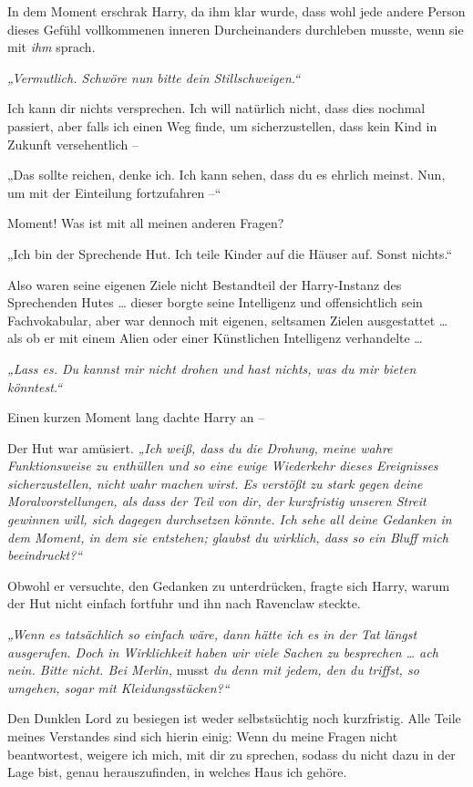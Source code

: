 {In dem Moment erschrak Harry, da ihm klar wurde, dass wohl jede andere Person dieses Gefühl vollkommenen inneren Durcheinanders durchleben musste, wenn sie mit \emph{ihm} sprach.

\emph{„Vermutlich. Schwöre nun bitte dein Stillschweigen.“}

Ich kann dir nichts versprechen. Ich will natürlich nicht, dass dies nochmal passiert, aber falls ich einen Weg finde, um sicherzustellen, dass kein Kind in Zukunft versehentlich --

„Das sollte reichen, denke ich. Ich kann sehen, dass du es ehrlich meinst. Nun, um mit der Einteilung fortzufahren --“

Moment! Was ist mit all meinen anderen Fragen?

„Ich bin der Sprechende Hut. Ich teile Kinder auf die Häuser auf. Sonst nichts.“

Also waren seine eigenen Ziele nicht Bestandteil der Harry-Instanz des Sprechenden Hutes … dieser borgte seine Intelligenz und offensichtlich sein Fachvokabular, aber war dennoch mit eigenen, seltsamen Zielen ausgestattet … als ob er mit einem Alien oder einer Künstlichen Intelligenz verhandelte …

\emph{„Lass es. Du kannst mir nicht drohen und hast nichts, was du mir bieten könntest.“}

Einen kurzen Moment lang dachte Harry an --

Der Hut war amüsiert. \emph{„Ich weiß, dass du die Drohung, meine wahre Funktionsweise zu enthüllen und so eine ewige Wiederkehr dieses Ereignisses sicherzustellen, nicht wahr machen wirst. Es verstößt zu stark gegen deine Moralvorstellungen, als dass der Teil von dir, der kurzfristig unseren Streit gewinnen will, sich dagegen durchsetzen könnte. Ich sehe all deine Gedanken in dem Moment, in dem sie entstehen; glaubst du wirklich, dass so ein Bluff mich beeindruckt?“}

Obwohl er versuchte, den Gedanken zu unterdrücken, fragte sich Harry, warum der Hut nicht einfach fortfuhr und ihn nach Ravenclaw steckte.

\emph{„Wenn es tatsächlich so einfach wäre, dann hätte ich es in der Tat längst ausgerufen. Doch in Wirklichkeit haben wir viele Sachen zu besprechen … ach nein. Bitte nicht. Bei Merlin,} musst \emph{du denn mit jedem, den du triffst, so umgehen, sogar mit Kleidungsstücken?“}

Den Dunklen Lord zu besiegen ist weder selbstsüchtig noch kurzfristig. Alle Teile meines Verstandes sind sich hierin einig: Wenn du meine Fragen nicht beantwortest, weigere ich mich, mit dir zu sprechen, sodass du nicht dazu in der Lage bist, genau herauszufinden, in welches Haus ich gehöre.

}
